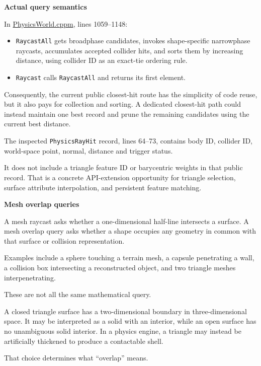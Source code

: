 \textbf{Actual query semantics}

In \href{https://github.com/swayam8624/KairoPhysicsEngine/blob/main/PhysicsWorld.cppm?utm_source=chatgpt.com}{PhysicsWorld.cppm}, lines 1059--1148:

\begin{itemize}
\tightlist
\item
  \texttt{RaycastAll} gets broadphase candidates, invokes shape-specific narrowphase raycasts, accumulates accepted collider hits, and sorts them by increasing distance, using collider ID as an exact-tie ordering rule.
\item
  \texttt{Raycast} calls \texttt{RaycastAll} and returns its first element.
\end{itemize}

Consequently, the current public closest-hit route has the simplicity of code reuse, but it also pays for collection and sorting. A dedicated closest-hit path could instead maintain one best record and prune the remaining candidates using the current best distance.

The inspected \texttt{PhysicsRayHit} record, lines 64--73, contains body ID, collider ID, world-space point, normal, distance and trigger status.

It does not include a triangle feature ID or barycentric weights in that public record. That is a concrete API-extension opportunity for triangle selection, surface attribute interpolation, and persistent feature matching.

\textbf{Mesh overlap queries}

A mesh raycast asks whether a one-dimensional half-line intersects a surface. A mesh overlap query asks whether a shape occupies any geometry in common with that surface or collision representation.

Examples include a sphere touching a terrain mesh, a capsule penetrating a wall, a collision box intersecting a reconstructed object, and two triangle meshes interpenetrating.

These are not all the same mathematical query.

A closed triangle surface has a two-dimensional boundary in three-dimensional space. It may be interpreted as a solid with an interior, while an open surface has no unambiguous solid interior. In a physics engine, a triangle may instead be artificially thickened to produce a contactable shell.

That choice determines what ``overlap'' means.

